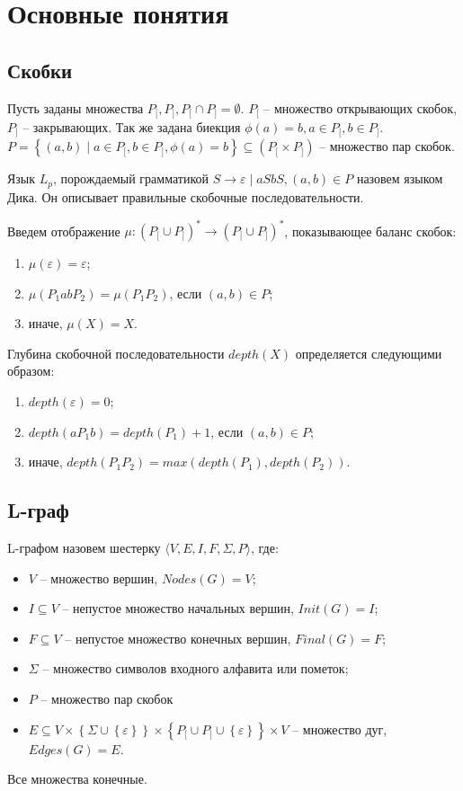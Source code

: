 \chapter{Основные понятия} \label{chapter1}
\section{Скобки}


Пусть заданы множества $P_[, P_], P_[ \cap P_] = \emptyset$. $P_[$ -- множество открывающих скобок, $P_]$ -- закрывающих.
Так же задана биекция $\phi(a) = b, a \in P_[, b \in P_]$.
$P = \left\{ (a, b) \mid a \in P_[, b \in P_], \phi(a) = b \right\} \subseteq \left( P_[ \times P_] \right)$ -- множество пар скобок.

Язык $L_p$, порождаемый грамматикой $S \rightarrow \varepsilon \mid a S b S, (a, b) \in P$ назовем языком Дика. Он описывает правильные скобочные последовательности.

Введем отображение $\mu : (P_[ \cup P_])^* \to (P_[ \cup P_])^* $, показывающее баланс скобок:
\begin{enumerate}
    \item $\mu(\varepsilon) = \varepsilon$;
    \item $\mu(P_1 a b P_2) = \mu(P_1 P_2)$, если $(a, b) \in P$;
    \item иначе, $\mu(X) = X$.
\end{enumerate}

Глубина скобочной последовательности $depth(X)$ определяется следующими образом:
\begin{enumerate}
    \item $depth(\varepsilon) = 0$;
    \item $depth(a P_1 b) = depth(P_1) + 1$, если $(a, b) \in P$;
    \item иначе, $depth(P_1 P_2) = max(depth(P_1), depth(P_2))$.
\end{enumerate}

\section{L-граф}
L-графом назовем шестерку $\langle V,E,I,F,\Sigma,P\rangle$, где:
\begin{itemize}
    \item $V$ -- множество вершин, $Nodes(G) = V$;
    \item $I \subseteq V$ -- непустое множество начальных вершин, $Init(G) = I$;
    \item $F \subseteq V$ -- непустое множество конечных вершин, $Final(G) = F$;
    \item $\Sigma$ -- множество символов входного алфавита или пометок;
    \item $P$ -- множество пар скобок
    \item $E \subseteq V 
                    \times \left\{ \Sigma \cup \left\{ \varepsilon \right\}\right\} 
                    \times \left\{ P_[ \cup P_] \cup \left\{ \varepsilon \right\} \right\} 
                    \times V $
        -- множество дуг, $Edges(G) = E$.
\end{itemize}
Все множества конечные.

